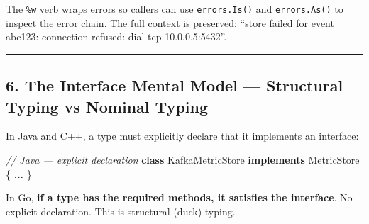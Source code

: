 \documentclass[
]{article}
\newenvironment{Shaded}{}{}
\newcommand{\CommentTok}[1]{\textcolor[rgb]{0.38,0.63,0.69}{\textit{#1}}}
\newcommand{\KeywordTok}[1]{\textcolor[rgb]{0.00,0.44,0.13}{\textbf{#1}}}
\newcommand{\NormalTok}[1]{#1}
\newcommand{\OperatorTok}[1]{\textcolor[rgb]{0.40,0.40,0.40}{#1}}
\begin{document}
The \texttt{\%w} verb wraps errors so callers can use
\texttt{errors.Is()} and \texttt{errors.As()} to inspect the error
chain. The full context is preserved: ``store failed for event abc123:
connection refused: dial tcp 10.0.0.5:5432''.

\begin{center}\rule{0.5\linewidth}{0.5pt}\end{center}

\hypertarget{the-interface-mental-model-structural-typing-vs-nominal-typing}{%
\subsection{6. The Interface Mental Model --- Structural Typing vs
Nominal
Typing}\label{the-interface-mental-model-structural-typing-vs-nominal-typing}}

In Java and C++, a type must explicitly declare that it implements an
interface:

\begin{Shaded}
\begin{Highlighting}[]
\CommentTok{// Java — explicit declaration}
\KeywordTok{class}\NormalTok{ KafkaMetricStore }\KeywordTok{implements}\NormalTok{ MetricStore }\OperatorTok{\{} \KeywordTok{...} \OperatorTok{\}}
\end{Highlighting}
\end{Shaded}

In Go, \textbf{if a type has the required methods, it satisfies the
interface}. No explicit declaration. This is structural (duck) typing.
\end{document}
